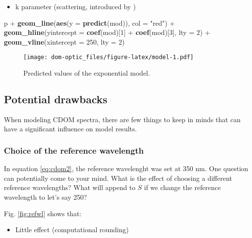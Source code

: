 \documentclass[]{book}
\newenvironment{Shaded}{\begin{snugshade}}{\end{snugshade}}
\newcommand{\KeywordTok}[1]{\textcolor[rgb]{0.13,0.29,0.53}{\textbf{{#1}}}}
\newcommand{\DataTypeTok}[1]{\textcolor[rgb]{0.13,0.29,0.53}{{#1}}}
\newcommand{\DecValTok}[1]{\textcolor[rgb]{0.00,0.00,0.81}{{#1}}}
\newcommand{\StringTok}[1]{\textcolor[rgb]{0.31,0.60,0.02}{{#1}}}
\newcommand{\NormalTok}[1]{{#1}}
\providecommand{\tightlist}{%
  \setlength{\itemsep}{0pt}\setlength{\parskip}{0pt}}
\begin{document}
\begin{itemize}
\tightlist
\item
  k parameter (scattering, introduced by \citet{Stedmon2001})
\end{itemize}

\begin{Shaded}
\begin{Highlighting}[]
\NormalTok{p +}\StringTok{ }\KeywordTok{geom_line}\NormalTok{(}\KeywordTok{aes}\NormalTok{(}\DataTypeTok{y =} \KeywordTok{predict}\NormalTok{(mod)), }\DataTypeTok{col =} \StringTok{"red"}\NormalTok{) +}
\StringTok{  }\KeywordTok{geom_hline}\NormalTok{(}\DataTypeTok{yintercept =} \KeywordTok{coef}\NormalTok{(mod)[}\DecValTok{1}\NormalTok{] +}\StringTok{ }\KeywordTok{coef}\NormalTok{(mod)[}\DecValTok{3}\NormalTok{], }\DataTypeTok{lty =} \DecValTok{2}\NormalTok{) +}
\StringTok{  }\KeywordTok{geom_vline}\NormalTok{(}\DataTypeTok{xintercept =} \DecValTok{250}\NormalTok{, }\DataTypeTok{lty =} \DecValTok{2}\NormalTok{)}
\end{Highlighting}
\end{Shaded}

\begin{figure}[htbp]
\centering
\texttt{[image: dom-optic\_files/figure-latex/model-1.pdf]}
\caption{\label{fig:model}Predicted values of the exponential model.}
\end{figure}

\subsection{Potential drawbacks}\label{potential-drawbacks}

When modeling CDOM spectra, there are few things to keep in minds that
can have a significant influence on model results.

\subsubsection{Choice of the reference
wavelength}\label{choice-of-the-reference-wavelength}

In equation \ref{eq:cdom2}, the reference wavelenght was set at 350 nm.
One question can potentially come to your mind. What is the effect of
choosing a different reference wavelengths? What will append to \(S\) if
we change the reference wavelength to let's say 250?

Fig. \ref{fig:refwl} shows that:

\begin{itemize}
\tightlist
\item
  Little effect (computational rounding)
\end{itemize}
\end{document}
